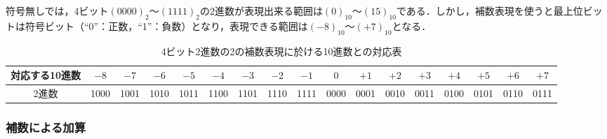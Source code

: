 \newpage


符号無しでは，4ビット$(0000)_{2} ～ (1111)_{2}$の2進数が表現出来る範囲は$(0)_{10} ～ (15)_{10}$である．しかし，補数表現を使うと最上位ビットは符号ビット（“0”：正数，“1”：負数）となり，表現できる範囲は$(-8)_{10} ～ (+7)_{10}$となる．

\begin{table}[H]
	\caption{4ビット2進数の2の補数表現に於ける10進数との対応表}
	\label{tab:com_arch-4}
	\centering
	\begin{tabular}{c|cccccccccccccccc}
		\hline
		\textsf{対応する10進数} &
		$-8$ & $-7$ & $-6$ & $-5$ &
		$-4$ & $-3$ & $-2$ & $-1$ &
		$ 0$ & $+1$ & $+2$ & $+3$ &
		$+4$ & $+5$ & $+6$ & $+7$ \\
		\hline
		\textsf{2進数} &
		1000 & 1001 & 1010 & 1011 &
		1100 & 1101 & 1110 & 1111 &
		0000 & 0001 & 0010 & 0011 &
		0100 & 0101 & 0110 & 0111 \\
		\hline
	\end{tabular}
\end{table}



\subsubsection{補数による加算}\label{sec:com_arch-2-C-5}

